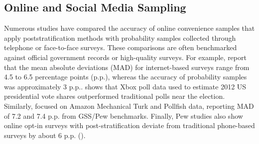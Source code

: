 


\subsection{Online and Social Media Sampling}

Numerous studies have compared the accuracy of online convenience samples that apply poststratification methods with probability samples collected through telephone or face-to-face surveys. These comparisons are often benchmarked against official government records or high-quality surveys. For example, \citet{yeager2011comparing} report that the mean absolute deviations (MAD) for internet-based surveys range from 4.5 to 6.5 percentage points (p.p.), whereas the accuracy of probability samples was approximately 3 p.p..  \citet{Wang2015} shows that Xbox poll data used to estimate 2012 US presidential vote shares outperformed traditional polls near the election. Similarly, \citet{goel2015non} focused on Amazon Mechanical Turk and Pollfish data, reporting MAD of 7.2 and 7.4 p.p. from GSS/Pew benchmarks. Finally, Pew studies also show online opt-in surveys with post-stratification deviate from traditional phone-based surveys by about 6 p.p. (\citealt{Mercer2018}).


